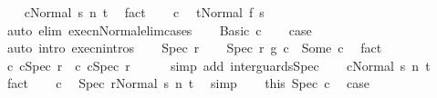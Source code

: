 \begin{isabellebody}
\ \ \isamarkupfalse%
\ {\isachardoublequoteopen}{\isasymGamma}{\isasymturnstile}{\isasymlangle}c{\isacharcomma}Normal\ s{\isasymrangle}\ {\isacharequal}n{\isasymRightarrow}\ t{\isachardoublequoteclose}\ \isamarkupfalse%
\ fact\isanewline
\ \ \isamarkupfalse%
\ c\ \isamarkupfalse%
\ {\isachardoublequoteopen}t{\isacharequal}Normal\ {\isacharparenleft}f\ s{\isacharparenright}{\isachardoublequoteclose}\isanewline
\ \ \ \ \isamarkupfalse%
\ {\isacharparenleft}auto\ elim{\isacharcolon}\ execn{\isacharunderscore}Normal{\isacharunderscore}elim{\isacharunderscore}cases{\isacharparenright}\isanewline
\ \ \isamarkupfalse%
\ Basic\ c{}\isanewline
\ \ \isamarkupfalse%
\ {\isacharquery}case\isanewline
\ \ \ \ \isamarkupfalse%
\ {\isacharparenleft}auto\ intro{\isacharcolon}\ execn{\isachardot}intros{\isacharparenright}\isanewline
{}\isamarkupfalse%
\isanewline
\ \ \isamarkupfalse%
\ {\isacharparenleft}Spec\ r{\isacharparenright}\isanewline
\ \ \isamarkupfalse%
\ {\isachardoublequoteopen}{\isacharparenleft}Spec\ r\ {\isasyminter}\isactrlsub g\ c{}{\isacharparenright}\ {\isacharequal}\ Some\ c{\isachardoublequoteclose}\ \isamarkupfalse%
\ fact\isanewline
\ \ \isamarkupfalse%
\ \isamarkupfalse%
\ c{}{\isacharcolon}\ {\isachardoublequoteopen}c{}{\isacharequal}Spec\ r{\isachardoublequoteclose}\ \ c{\isacharcolon}\ {\isachardoublequoteopen}c{\isacharequal}Spec\ r{\isachardoublequoteclose}\isanewline
\ \ \ \ \isamarkupfalse%
\ {\isacharparenleft}simp\ add{\isacharcolon}\ inter{\isacharunderscore}guards{\isacharunderscore}Spec{\isacharparenright}\isanewline
\ \ \isamarkupfalse%
\ {\isachardoublequoteopen}{\isasymGamma}{\isasymturnstile}{\isasymlangle}c{\isacharcomma}Normal\ s{\isasymrangle}\ {\isacharequal}n{\isasymRightarrow}\ t{\isachardoublequoteclose}\ \isamarkupfalse%
\ fact\isanewline
\ \ \isamarkupfalse%
\ c\ \isamarkupfalse%
\ {\isachardoublequoteopen}{\isasymGamma}{\isasymturnstile}{\isasymlangle}Spec\ r{\isacharcomma}Normal\ s{\isasymrangle}\ {\isacharequal}n{\isasymRightarrow}\ t{\isachardoublequoteclose}\ \isamarkupfalse%
\ simp\isanewline
\ \ \isamarkupfalse%
\ this\ Spec\ c{}\ \isamarkupfalse%
\ {\isacharquery}case\isanewline
\ \ \ \ \isamarkupfalse%

\end{isabellebody}
